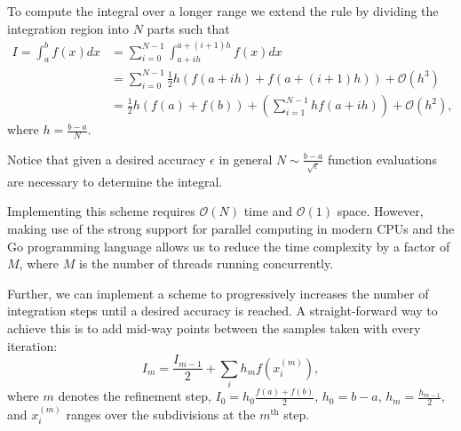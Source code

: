 \documentclass[10pt, a4paper]{article}
\begin{document}

  To compute the integral over a longer range we extend the rule by dividing the integration
  region into $N$ parts such that
  \begin{equation}
  \begin{split}
  I = \int_a^b f(x) dx & = \sum_{i=0}^{N-1} \int_{a+ih}^{a+(i+1)h} f(x) dx \\
  & = \sum_{i=0}^{N-1} \frac{1}{2} h (f(a+ih) + f(a+(i+1)h)) + \mathcal{O}(h^3) \\
  & = \frac{1}{2} h (f(a) + f(b)) + \left( \sum_{i=1}^{N-1} h f(a+ih) \right) + \mathcal{O}(h^2),
  \end{split}
  \end{equation}
  where $h = \frac{b-a}{N}$.

  Notice that given a desired accuracy $\epsilon$ in general $N \sim \frac{b-a}{\sqrt{\epsilon}}$
  function evaluations are necessary to determine the integral.

  Implementing this scheme requires $\mathcal{O}(N)$ time and $\mathcal{O}(1)$ space. However, making
  use of the strong support for parallel computing in modern CPUs and the Go programming language allows
  us to reduce the time complexity by a factor of $M$, where $M$ is the number of threads
  running concurrently\footnotemark.


  Further, we can implement a scheme to progressively increases the number of integration steps until
  a desired accuracy is reached. A straight-forward way to achieve this is to add mid-way points
  between the samples taken with every iteration:
  \begin{equation}
  \label{eq:trap-rec}
  I_m = \frac{I_{m-1}}{2} + \sum_i h_m f(x^{(m)}_i),
  \end{equation}
  where $m$ denotes the refinement step, $I_0 = h_0\frac{f(a) + f(b)}{2}$, $h_0 = b-a$,
  $h_m = \frac{h_{m-1}}{2}$, and $x^{(m)}_i$
  ranges over the subdivisions at the $m^{\text{th}}$ step.
\end{document}
